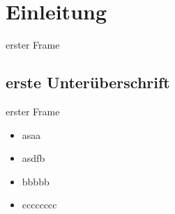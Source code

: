 \section{Einleitung}

\begin{frame}{erster Frame}
\end{frame}

\subsection{erste Unterüberschrift}
\begin{frame}{erster Frame}
\begin{itemize}
\item asaa
\item asdfb
\item bbbbb
\item cccccccc
\end{itemize}
\end{frame}
